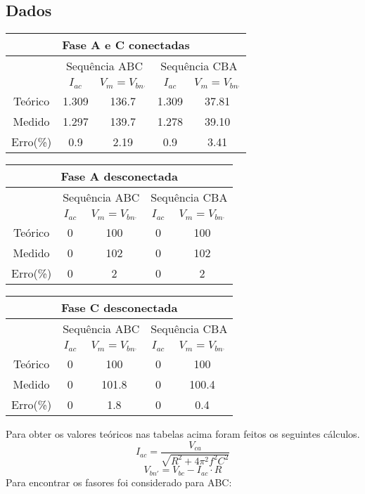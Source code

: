 \documentclass[a4paper, 12pt]{article}
\begin{document}
		\subsection{Dados}
			\begin{table}[H]
				\centering
				\begin{tabular}{|c|c|c|c|c|}
					\hline
					\multicolumn{5}{|c|}{Fase A e C conectadas }\\
					\hline
					& \multicolumn{2}{c|}{Sequência ABC} & \multicolumn{2}{c|}{Sequência CBA} \\ \hline
					& $I_{ac}$  & $V_m = V_{bn^,}$       & $I_{ac}$     & $V_m = V_{bn^,}$    \\ \hline
					Teórico  & 1.309 & 136.7 &    1.309 & 37.81  \\ \hline
					Medido   &    1.297 &   139.7      &  1.278     & 39.10   \\ \hline
					Erro(\%) & 0.9  &  2.19    &  0.9   & 3.41  \\ \hline
				\end{tabular}
			\end{table}
			\begin{table}[H]
				\centering
				\begin{tabular}{|c|c|c|c|c|}
					\hline
					\multicolumn{5}{|c|}{Fase A desconectada }\\
					\hline
					& \multicolumn{2}{c|}{Sequência ABC} & \multicolumn{2}{c|}{Sequência CBA} \\ \hline
					& $I_{ac}$  & $V_m = V_{bn^,}$       & $I_{ac}$     & $V_m = V_{bn^,}$    \\ \hline
					Teórico  &   0& 100  & 0 &  100 \\ \hline
					Medido   & 0 & 102 & 0  & 102  \\ \hline
					Erro(\%) & 0 &   2   &  0   &  2 \\ \hline
				\end{tabular}
			\end{table}
			\begin{table}[H]
				\centering
				\begin{tabular}{|c|c|c|c|c|}
					\hline
					\multicolumn{5}{|c|}{Fase C desconectada }\\
					\hline
					& \multicolumn{2}{c|}{Sequência ABC} & \multicolumn{2}{c|}{Sequência CBA} \\ \hline
					& $I_{ac}$  & $V_m = V_{bn^,}$       & $I_{ac}$     & $V_m = V_{bn^,}$    \\ \hline
					Teórico  &   0& 100  & 0 &  100 \\ \hline
					Medido   & 0 & 101.8 & 0  & 100.4  \\ \hline
					Erro(\%) & 0 &   1.8   &  0   & 0.4  \\ \hline
				\end{tabular}
			\end{table}
			Para obter os valores teóricos nas tabelas acima foram feitos os seguintes cálculos.
			\[I_{ac} = \frac{V_{ca}}{\sqrt{R^2+4\pi^2f^2C^2}}\]
			\[ V_{bn'} = V_{bc} - I_{ac} \cdot R\]
			Para encontrar os fasores foi considerado para ABC:
			
\end{document}
